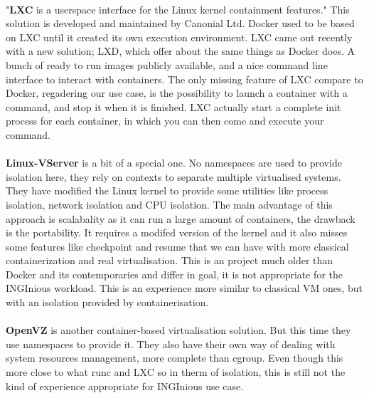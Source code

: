 \paragraph{}"\textbf{LXC} is a userspace interface for the Linux kernel containment features."\cite{lxc}  This solution is developed and maintained by Canonial Ltd.  Docker used to be based on LXC until it created its own execution environment.  LXC came out recently with a new solution; LXD, which offer about the same things as Docker does.  A bunch of ready to run images publicly available, and a nice command line interface to interact with containers.  The only missing feature of LXC compare to Docker, regadering our use case, is the possibility to launch a container with a command, and stop it when it is finished.  LXC actually start a complete init process for each container, in which you can then come and execute your command.

\paragraph{}\textbf{Linux-VServer}\cite{linux-vserver} is a bit of a special one.  No namespaces are used to provide isolation here, they rely on contexts to separate multiple virtualised systems.  They have modified the Linux kernel to provide some utilities like process isolation, network isolation and CPU isolation.  The main advantage of this approach is scalabality as it can run a large amount of containers, the drawback is the portability.  It requires a modifed version of the kernel and it also misses some features like checkpoint and resume that we can have with more classical containerization and real virtualisation.  This is an project much older than Docker and its contemporaries and differ in goal, it is not appropriate for the INGInious workload.  This is an experience more similar to classical VM ones, but with an isolation provided by containerisation.

\paragraph{}\textbf{OpenVZ}\cite{openvz} is another container-based virtualisation solution.  But this time they use namespaces to provide it.  They also have their own way of dealing with system resources management, more complete than cgroup.  Even though this more close to what runc and LXC so in therm of isolation, this is still not the kind of experience appropriate for INGInious use case.

